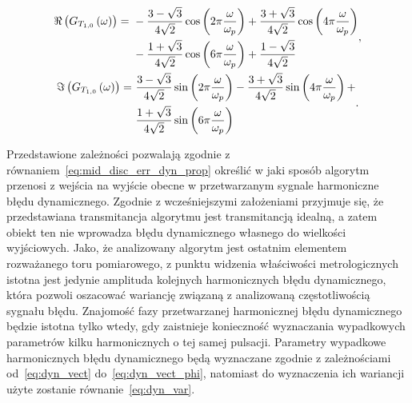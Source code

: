 \begin{gather}
\begin{split}
\Re \left( G_{T_{1,0}} \left(\omega\right) \right) = ~
& - \frac{3 - \sqrt{3}}{4 \sqrt{2}} \cos \left(2 \pi \frac{\omega}{\omega_{p}}\right) + \frac{3 + \sqrt{3}}{4 \sqrt{2}} \cos \left(4 \pi \frac{\omega}{\omega_{p}}\right) \\
& - \frac{1 + \sqrt{3}}{4 \sqrt{2}} \cos \left(6 \pi \frac{\omega}{\omega_{p}}\right) + \frac{1 - \sqrt{3}}{4 \sqrt{2}}
\end{split}
\label{eq:sym_partd_output_trans_wn_re_T_1_0}, \\
\begin{split}
\Im \left( G_{T_{1,0}} \left(\omega\right) \right) = ~
& \frac{3 - \sqrt{3}}{4 \sqrt{2}} \sin \left(2 \pi \frac{\omega}{\omega_{p}}\right) - \frac{3 + \sqrt{3}}{4 \sqrt{2}} \sin \left(4 \pi \frac{\omega}{\omega_{p}}\right) + \\
& \frac{1 + \sqrt{3}}{4 \sqrt{2}} \sin \left(6 \pi \frac{\omega}{\omega_{p}}\right)
\end{split}
\label{eq:sym_partd_output_trans_wn_im_T_1_0}.
\end{gather}

Przedstawione zależności pozwalają zgodnie z równaniem~\eqref{eq:mid_disc_err_dyn_prop} określić w jaki sposób algorytm przenosi z wejścia na wyjście obecne w przetwarzanym sygnale harmoniczne błędu dynamicznego. Zgodnie z wcześniejszymi założeniami przyjmuje się, że przedstawiana transmitancja algorytmu jest transmitancją idealną, a zatem obiekt ten nie wprowadza błędu dynamicznego własnego do wielkości wyjściowych. Jako, że analizowany algorytm jest ostatnim elementem rozważanego toru pomiarowego, z punktu widzenia właściwości metrologicznych istotna jest jedynie amplituda kolejnych harmonicznych błędu dynamicznego, która pozwoli oszacować wariancję związaną z analizowaną częstotliwością sygnału błędu. Znajomość fazy przetwarzanej harmonicznej błędu dynamicznego będzie istotna tylko wtedy, gdy zaistnieje konieczność wyznaczania wypadkowych parametrów kilku harmonicznych o tej samej pulsacji. Parametry wypadkowe harmonicznych błędu dynamicznego będą wyznaczane zgodnie z zależnościami od~\eqref{eq:dyn_vect} do~\eqref{eq:dyn_vect_phi}, natomiast do wyznaczenia ich wariancji użyte zostanie równanie~\eqref{eq:dyn_var}.

